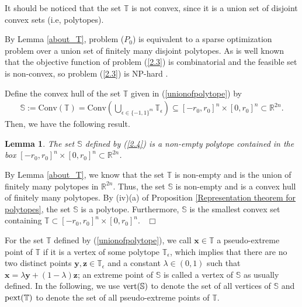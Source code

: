 \documentclass[12pt]{article}
\newtheorem{Lemma}{Lemma}[part]
\def \ep{\hbox{ }\hfill$\Box$}
\def\reff#1{{\rm(\ref{#1})}}
\begin{document}
It should be noticed that the set $\mathbb{T}$  is  not  convex, since it
is a union set of disjoint convex sets (i.e, polytopes).


By Lemma \ref{about_T}, problem ($P_0$) is equivalent to a
sparse optimization problem over a  union set of finitely many disjoint polytopes.
As is well known that the objective function of problem \reff{2.3} is
combinatorial and the feasible set is non-convex, so problem
\reff{2.3} is NP-hard \cite{Nata95linearL0-NP-hard}.

Define the convex hull of the set $\mathbb{T} $ given in (\ref{unionofpolytope}) by
\begin{eqnarray}\label{2.4}
\mathbb{S}:= \textrm{Conv}(\mathbb{T}) =
\textrm{Conv}\left(\bigcup_{\epsilon\in\{-1,1\}^{m}}\mathbb{T}_{\epsilon}\right)\subseteq [-r_0,r_0]^n\times[0,r_0]^n\subset\mathbb{R}^{2n}.
\end{eqnarray}
Then, we have the following result.
\begin{Lemma}\label{OnS}
The set $\mathbb{S}$ defined by (\ref{2.4}) is a non-empty polytope contained in the box $[-r_0,r_0]^n\times[0,r_0]^n\subset\mathbb{R}^{2n}$.
\end{Lemma}

 By Lemma \ref{about_T}, we know that the set $\mathbb{T}$ is non-empty and  is  the union  of finitely many
polytopes in $\mathbb{R}^{2n}$. Thus, the set $\mathbb{S}$ is  non-empty and is a convex hull of finitely many polytopes. By
(iv)(a) of Proposition \ref{Representation theorem for polytopes}, the set
$\mathbb{S}$ is a polytope. Furthermore, $\mathbb{S}$ is the
smallest convex set containing
$\mathbb{T}\subset[-r_0,r_0]^n\times[0,r_0]^n$.
\ep

For the set $\mathbb{T}$ defined by (\ref{unionofpolytope}), we call $\mathbf{x}\in \mathbb{T}$ a pseudo-extreme point of $\mathbb{T}$ if it is a vertex of some polytope $\mathbb{T}_{\epsilon}$, which implies that there are no two distinct points $\mathbf{y}, \mathbf{z}\in \mathbb{T}_{\epsilon}$ and a constant $\lambda\in(0,1)$ such that $\mathbf{x}=\lambda \mathbf{y}+(1-\lambda)\mathbf{z}$;
an extreme point of $\mathbb{S}$  is called a vertex of $\mathbb{S}$ as usually defined. In the following, we use $\mathrm{\rm vert }(\mathbb{S})$ to denote the set of all vertices of $\mathbb{S}$ and $\mathrm{\rm pext}(\mathbb{T})$ to denote the set of all pseudo-extreme points of $\mathbb{T}$.
\end{document}
